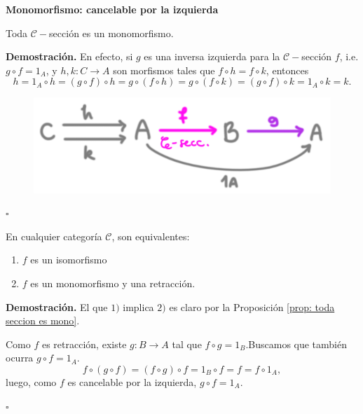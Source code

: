 \documentclass[10pt]{article}
\newcommand*{\QEDB}{\null\nobreak\hfill\ensuremath{\square}}%
\newtheorem[M]{teo}{Teorema}[section]
\newtheorem[M]{listaObj}[teo]{Lista de deseos}
\newtheorem[M]{preg}[teo]{Pregunta}
\newtheorem[M]{lema}[teo]{Lema}
\newtheorem[M]{hip}[teo]{Hipótesis}
\newtheorem[M]{prop}[teo]{Proposición}
\newtheorem[M]{obs}[teo]{Observación}
\newtheorem[M]{cor}[teo]{Corolario}
\newtheorem[M]{notacion}[teo]{Notación}
\newtheorem[M]{nota}[teo]{Nota}
\begin{document}
\begin{center}
\textbf{Monomorfismo: cancelable por la izquierda}
\end{center}


\begin{prop}
	\label{prop: toda seccion es mono}
Toda $\mathcal{C}-$sección es un monomorfismo.
\end{prop}
\noindent
\textbf{Demostración.}
En efecto, si $g$ es una inversa izquierda para
la $\mathcal{C}-$sección $f$, i.e.
$g \circ f = 1_{A}$,
y 
$h, k: C \longrightarrow A$ son morfismos 
tales que $f \circ h = f \circ k$,
entonces
\[
h = 1_{A} \circ h = (g \circ f) \circ h = g \circ ( f \circ h)
= g \circ (f \circ k) = (g \circ f) \circ k = 1_{A} \circ k = k.  
\]

\begin{figure}[H]
\centering
	\includegraphics[scale=2.5]{cat5} 
 \end{figure}
\QEDB
\vspace{0.2cm}

\begin{prop}
En cualquier categoría $\mathcal{C}$, son equivalentes:
\begin{enumerate}
	\item $f$ es un isomorfismo
	\item $f$ es un monomorfismo y una retracción.
\end{enumerate}
\end{prop}
\noindent
\textbf{Demostración.}
El que $1)$ implica $2)$ es claro por la Proposición 
\ref{prop: toda seccion es mono}. 

Como $f$ es retracción, existe $g: B \longrightarrow A$ tal que
$f \circ g = 1_{B}$.Buscamos que también ocurra 
$g \circ f = 1_{A}$. 
\[
f \circ (g \circ f) = (f \circ g ) \circ f = 
1_{B} \circ f = f = f \circ 1_{A},
\]
luego, como $f$ es cancelable por la izquierda, 
$g \circ f = 1_{A}$.

\QEDB
\vspace{0.2cm}
\end{document}
